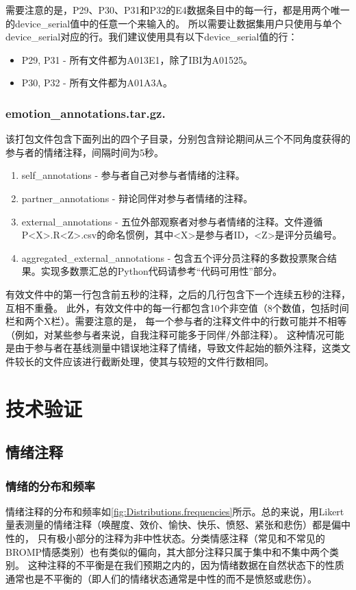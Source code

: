 需要注意的是，P29、P30、P31和P32的E4数据条目中的每一行，都是用两个唯一的device\_serial值中的任意一个来输入的。
所以需要让数据集用户只使用与单个device\_serial对应的行。我们建议使用具有以下device\_serial值的行：
\begin{itemize}
    \item P29, P31 - 所有文件都为A013E1，除了IBI为A01525。
    \item P30, P32 - 所有文件都为A01A3A。
\end{itemize}

\subsubsection{emotion\_annotations.tar.gz.}
该打包文件包含下面列出的四个子目录，分别包含辩论期间从三个不同角度获得的参与者的情绪注释，间隔时间为5秒。
\begin{enumerate}
    \item self\_annotations - 参与者自己对参与者情绪的注释。
    \item partner\_annotations - 辩论同伴对参与者情绪的注释。
    \item external\_annotations - 五位外部观察者对参与者情绪的注释。文件遵循P<X>.R<Z>.csv的命名惯例，其中<X>是参与者ID，<Z>是评分员编号。
    \item aggregated\_external\_annotations - 包含五个评分员注释的多数投票聚合结果。实现多数票汇总的Python代码请参考“代码可用性”部分。
\end{enumerate}

有效文件中的第一行包含前五秒的注释，之后的几行包含下一个连续五秒的注释，互相不重叠。
此外，有效文件中的每一行都包含10个非空值（8个数值，包括时间栏和两个X栏）。需要注意的是，
每一个参与者的注释文件中的行数可能并不相等（例如，对某些参与者来说，自我注释可能多于同伴/外部注释）。
这种情况可能是由于参与者在基线测量中错误地注释了情绪，导致文件起始的额外注释，这类文件较长的文件应该进行截断处理，使其与较短的文件行数相同。

\section{技术验证}
\subsection{情绪注释}
\subsubsection{情绪的分布和频率}
情绪注释的分布和频率如\autoref{fig:Distributions.frequencies}所示。总的来说，用Likert量表测量的情绪注释（唤醒度、效价、愉快、快乐、愤怒、紧张和悲伤）都是偏中性的，
只有极小部分的注释为非中性状态。分类情感注释（常见和不常见的BROMP情感类别）也有类似的偏向，其大部分注释只属于集中和不集中两个类别。
这种注释的不平衡是在我们预期之内的，因为情绪数据在自然状态下的性质通常也是不平衡的（即人们的情绪状态通常是中性的而不是愤怒或悲伤）。

